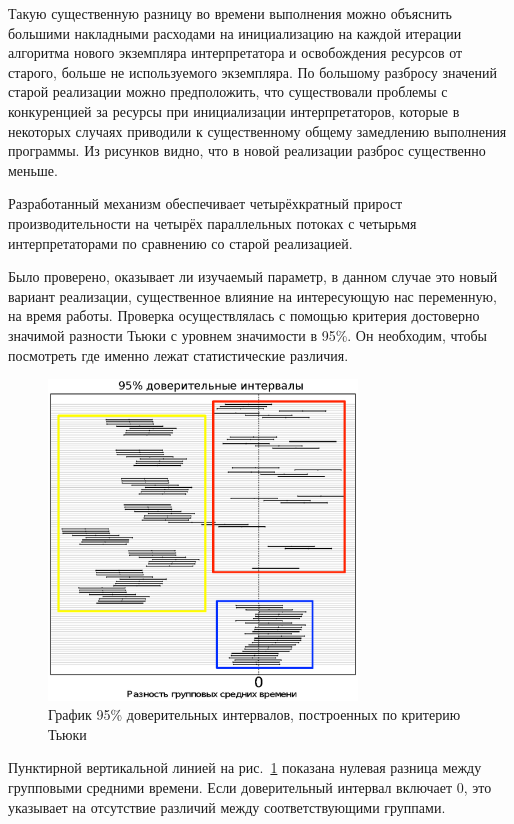 Такую существенную разницу во времени выполнения
можно объяснить большими накладными расходами
на инициализацию на каждой итерации алгоритма
нового экземпляра интерпретатора
и освобождения ресурсов от старого,
больше не используемого экземпляра.
По большому разбросу значений
старой реализации можно предположить,
что существовали проблемы с конкуренцией
за ресурсы при инициализации интерпретаторов,
которые в некоторых случаях приводили к
существенному общему замедлению выполнения программы.
Из рисунков видно,
что в новой реализации разброс существенно меньше.

Разработанный механизм обеспечивает
четырёхкратный прирост производительности
на четырёх параллельных потоках
с четырьмя интерпретаторами по
сравнению со старой реализацией.

Было проверено, оказывает ли изучаемый параметр,
в данном случае это новый вариант реализации,
существенное влияние на интересующую нас
переменную, на время работы.
Проверка осуществлялась с помощью
критерия достоверно значимой
разности Тьюки
с уровнем значимости в 95\%.
Он необходим, чтобы посмотреть
где именно лежат статистические различия.

\begin{figure}[!h]
\centering
\includegraphics[width=0.73\textwidth]{tukey}
\caption{График 95\% доверительных интервалов,
построенных по критерию Тьюки}
\label{fig:tukey}
\end{figure}

Пунктирной вертикальной линией на рис.~\ref{fig:tukey}
показана нулевая разница между групповыми средними времени.
Если доверительный интервал включает 0,
это указывает на отсутствие различий
между соответствующими группами.

